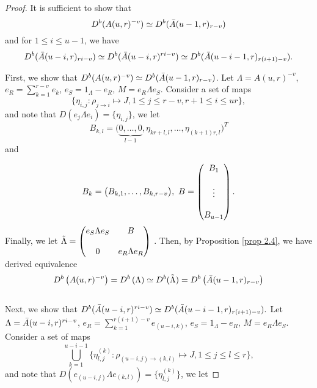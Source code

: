 \documentclass[a4paper, reqno]{amsart}
\theoremstyle{definition}
\theoremstyle{remark}
\numberwithin{equation}{section}
\begin{document}
   
\begin{proof}
 It is sufficient to show that 
   $$D^{b}(A(u,r)^{-v}) \simeq   D^{b}(\Bar{A}(u-1,r)_{r-v})$$
   and for $ 1\leq i \leq u-1$, we have
   $$D^{b}(\Bar{A}(u-i,r)_{ri-v})\simeq D^{b}(\Bar{A}(u-i,r)^{ri-v}) \simeq  D^{b}(\Bar{A}(u-i-1,r)_{r(i+1)-v}).$$
   
   First, we show that $D^{b}(A(u,r)^{-v}) \simeq   D^{b}(\Bar{A}(u-1,r)_{r-v})$. Let $\Lambda =A(u,r)^{-v}$, $e_R = \sum_{k=1}^{r-v} e_{k} $, $ e_S = 1_\Lambda - e_R $, $ M = e_{R} \Lambda e_{S} $. Consider a set of maps
   $$
  \{ \eta_{i,j}: \rho_{j \to i}\mapsto J, 1\leq j \leq r-v, r+1 \leq i \leq ur
  \},$$
  and note that $D(e_j \Lambda e_i) = \{ \eta_{i,j} \}$, we let 
  $$B_{k,l} =   \big(\underbrace{ 0,\dots,0 }_{l-1\text{}}, \eta_{kr+l,l},\dots,\eta_{(k+1)r,l}\big)^{T}$$
  and 

  \begin{align*}
       B_k = \big( B_{k,1},\dots, B_{k,r-v} \big), \,\,
       B   =  \left( \begin{matrix}
          B_1    \cr\cr
        \vdots              \cr\cr
         B_{u-1}
    \end{matrix}\right).
  \end{align*}
  Finally, we let $\Tilde{\Lambda} =  \left( \begin{matrix}
     e_S \Lambda e_S  & B      \cr\cr
     0  & e_R \Lambda e_R      
\end{matrix}\right) $ .
Then, by Proposition \ref{prop 2.4}, we have derived equivalence \\

  $$
  D^{b}\left(A(u,r)^{-v}\right)=D^{b}\left(\Lambda\right) \simeq D^{b}(\Tilde{\Lambda}) = D^{b}\left(\Bar{A}(u-1,r)_{r-v}\right)
  $$\\
  
Next, we show that $D^{b}(\Bar{A}(u-i,r)^{ri-v}) \simeq  D^{b}(\Bar{A}(u-i-1,r)_{r(i+1)-v}).$ 
Let $\Lambda =\Bar{A}(u-i,r)^{ri-v}$, $e_R = \sum_{k=1}^{r(i+1)-v} e_{(u-i,k)} $, $ e_S = 1_\Lambda - e_R $, $ M = e_{R} \Lambda e_{S} $. Consider a set of maps
 $$
 \bigcup_{k=1}^{u-i-1} \{ \eta_{l,j}^{(k)}: \rho_{(u-i,j) \to (k,l)}\mapsto J, 1\leq j \leq l \leq r \},
   $$
and note that $D(e_{(u-i,j)} \Lambda e_{(k,l)}) = \{ \eta_{l,j}^{(k)} \}$, we let


\end{proof}
\end{document}
